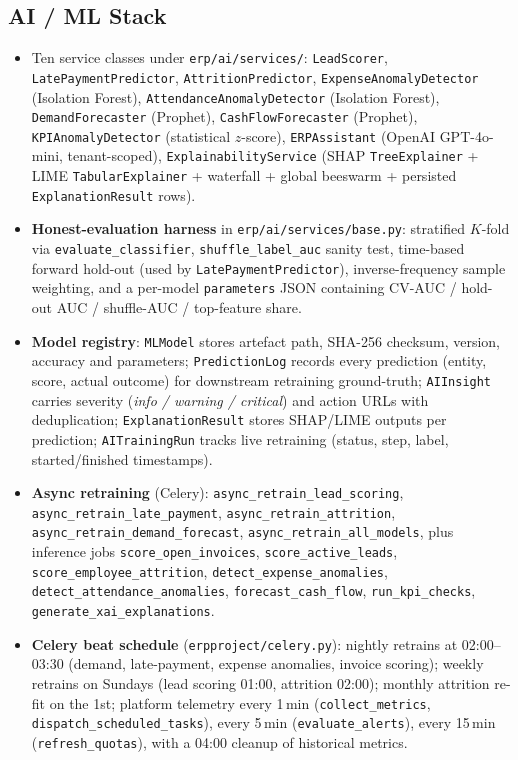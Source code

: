 \documentclass[12pt,a4paper]{report}
\begin{document}
\subsection{AI / ML Stack}
\begin{itemize}
  \item Ten service classes under \texttt{erp/ai/services/}: \texttt{LeadScorer}, \texttt{LatePaymentPredictor}, \texttt{AttritionPredictor}, \texttt{ExpenseAnomalyDetector} (Isolation Forest), \texttt{AttendanceAnomalyDetector} (Isolation Forest), \texttt{DemandForecaster} (Prophet), \texttt{CashFlowForecaster} (Prophet), \texttt{KPIAnomalyDetector} (statistical $z$-score), \texttt{ERPAssistant} (OpenAI GPT-4o-mini, tenant-scoped), \texttt{ExplainabilityService} (SHAP \texttt{TreeExplainer} + LIME \texttt{TabularExplainer} + waterfall + global beeswarm + persisted \texttt{ExplanationResult} rows).
  \item \textbf{Honest-evaluation harness} in \texttt{erp/ai/services/base.py}: stratified $K$-fold via \texttt{evaluate\_classifier}, \texttt{shuffle\_label\_auc} sanity test, time-based forward hold-out (used by \texttt{LatePaymentPredictor}), inverse-frequency sample weighting, and a per-model \texttt{parameters} JSON containing CV-AUC / hold-out AUC / shuffle-AUC / top-feature share.
  \item \textbf{Model registry}: \texttt{MLModel} stores artefact path, SHA-256 checksum, version, accuracy and parameters; \texttt{PredictionLog} records every prediction (entity, score, actual outcome) for downstream retraining ground-truth; \texttt{AIInsight} carries severity (\emph{info / warning / critical}) and action URLs with deduplication; \texttt{ExplanationResult} stores SHAP/LIME outputs per prediction; \texttt{AITrainingRun} tracks live retraining (status, step, label, started/finished timestamps).
  \item \textbf{Async retraining} (Celery): \texttt{async\_retrain\_lead\_scoring}, \texttt{async\_retrain\_late\_payment}, \texttt{async\_retrain\_attrition}, \texttt{async\_retrain\_demand\_forecast}, \texttt{async\_retrain\_all\_models}, plus inference jobs \texttt{score\_open\_invoices}, \texttt{score\_active\_leads}, \texttt{score\_employee\_attrition}, \texttt{detect\_expense\_anomalies}, \texttt{detect\_attendance\_anomalies}, \texttt{forecast\_cash\_flow}, \texttt{run\_kpi\_checks}, \texttt{generate\_xai\_explanations}.
  \item \textbf{Celery beat schedule} (\texttt{erpproject/celery.py}): nightly retrains at 02:00--03:30 (demand, late-payment, expense anomalies, invoice scoring); weekly retrains on Sundays (lead scoring 01:00, attrition 02:00); monthly attrition re-fit on the 1st; platform telemetry every 1\,min (\texttt{collect\_metrics}, \texttt{dispatch\_scheduled\_tasks}), every 5\,min (\texttt{evaluate\_alerts}), every 15\,min (\texttt{refresh\_quotas}), with a 04:00 cleanup of historical metrics.

\end{itemize}
\end{document}
